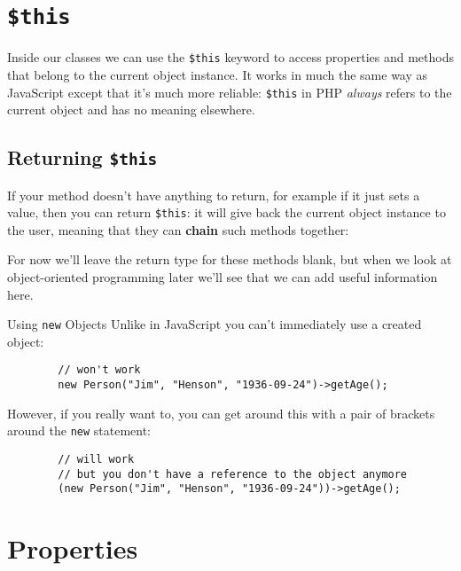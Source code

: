 \section{\texttt{\$this}}

Inside our classes we can use the \texttt{\$this} keyword to access properties and methods that belong to the current object instance. It works in much the same way as JavaScript except that it's much more reliable: \texttt{\$this} in PHP \textit{always} refers to the current object and has no meaning elsewhere.



\subsection{Returning \texttt{\$this}}

If your method doesn't have anything to return, for example if it just sets a value, then you can return \texttt{\$this}: it will give back the current object instance to the user, meaning that they can \textbf{chain} such methods together:


For now we'll leave the return type for these methods blank, but when we look at object-oriented programming later we'll see that we can add useful information here.


\begin{infobox}{Using \texttt{new} Objects}
    Unlike in JavaScript you can't immediately use a created object:

    \begin{verbatim}
        // won't work
        new Person("Jim", "Henson", "1936-09-24")->getAge();
    \end{verbatim}

    However, if you really want to, you can get around this with a pair of brackets around the \texttt{new} statement:

    \begin{verbatim}
        // will work
        // but you don't have a reference to the object anymore
        (new Person("Jim", "Henson", "1936-09-24"))->getAge();
    \end{verbatim}
\end{infobox}




\section{Properties}

